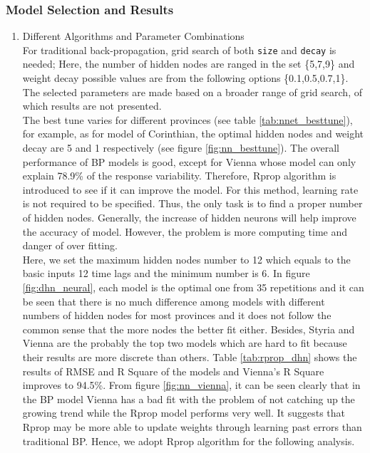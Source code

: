 \documentclass[a4paper,reqno,]{article}
\begin{document}
\subsubsection{Model Selection and Results} 
\begin{enumerate}
    \item Different Algorithms and Parameter Combinations
    \\For traditional back-propagation, grid search of both \texttt{size} and \texttt{decay} is needed; Here, the number of hidden nodes are ranged in the set \{5,7,9\} and weight decay possible values are from the following options \{0.1,0.5,0.7,1\}. The selected parameters are made based on a broader range of grid search, of which results are not presented.
\\
The best tune varies for different provinces (see table \ref{tab:nnet_besttune}), for example, as for model of Corinthian, the optimal hidden nodes and weight decay are 5 and 1 respectively (see figure \ref{fig:nn_besttune}). The overall performance of BP models is good, except for Vienna whose model can only explain 78.9\% of the response variability. 
Therefore, Rprop algorithm is introduced to see if it can improve the model. For this method, learning rate is not required to be specified. Thus, the only task is to find a proper number of hidden nodes. Generally, the increase of hidden neurons will help improve the accuracy of model. However, the problem is more computing time and danger of over fitting. 
\\
Here, we set the maximum hidden nodes number to 12 which equals to the basic inputs 12 time lags and the minimum number is 6. In figure \ref{fig:dhn_neural}, each model is the optimal one from 35 repetitions and it can be seen that there is no much difference among models with different numbers of hidden nodes for most provinces and it does not follow the common sense that the more nodes the better fit either. Besides, Styria and Vienna are the probably the top two models which are hard to fit because their results are more discrete than others. Table \ref{tab:rprop_dhn} shows the results of RMSE and R Square of the models and Vienna's R Square improves to 94.5\%. From figure \ref{fig:nn_vienna}, it can be seen clearly that in the BP model Vienna has a bad fit with the problem of not catching up the growing trend while the Rprop model performs very well. It suggests that Rprop may be more able to update weights through learning past errors than traditional BP. Hence, we adopt Rprop algorithm for the following analysis.

\end{enumerate}
\end{document}
